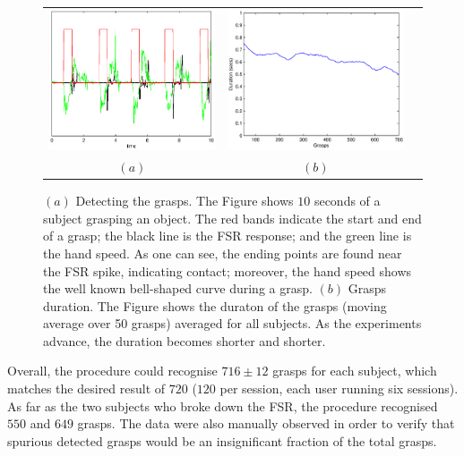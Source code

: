 \begin{figure}[htbp]
  \begin{center}
    \begin{tabular}{ccc}
      \includegraphics[width=0.48\linewidth]{grasp_seq_scotch.eps} &
      \includegraphics[width=0.48\linewidth]{grasp_trend.eps} \\
      $(a)$ & $(b)$
    \end{tabular}
    \caption{$(a)$ Detecting the grasps. The Figure shows $10$ seconds
    of a subject grasping an object. The red bands indicate the start
    and end of a grasp; the black line is the FSR response; and the
    green line is the hand speed. As one can see, the ending points
    are found near the FSR spike, indicating contact; moreover, the
    hand speed shows the well known bell-shaped curve during a
    grasp. $(b)$ Grasps duration. The Figure shows the duraton of the
    grasps (moving average over 50 grasps) averaged for all
    subjects. As the experiments advance, the duration becomes shorter
    and shorter.}
    \label{fig:grasp_sequence}
  \end{center}
\end{figure}

Overall, the procedure could recognise $716 \pm 12$ grasps for each
subject, which matches the desired result of $720$ ($120$ per session,
each user running six sessions). As far as the two subjects who broke
down the FSR, the procedure recognised $550$ and $649$ grasps. The
data were also manually observed in order to verify that spurious
detected grasps would be an insignificant fraction of the total
grasps.

